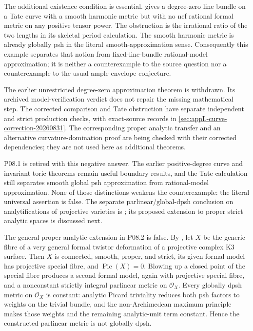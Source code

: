 The additional existence condition is essential.
 gives a degree-zero
line bundle on a Tate curve with a smooth harmonic metric but with no nef
rational formal metric on any positive tensor power.  The obstruction is
the irrational ratio of the two lengths in its skeletal period
calculation.  The smooth harmonic metric is already globally psh in the
literal smooth-approximation sense.  Consequently this example separates
that notion from fixed-line-bundle rational-model approximation; it is
neither a counterexample to the source question nor a counterexample to
the usual ample envelope conjecture.

The earlier unrestricted degree-zero approximation theorem is withdrawn.
Its archived model-verification verdict does not repair the missing
mathematical step.  The corrected comparison and Tate obstruction have
separate independent and strict production checks, with exact-source
records in \cref{sec:appL-curve-correction-20260831}.  The corresponding
proper analytic transfer and an alternative curvature-domination proof
are being checked with their corrected dependencies; they are not used
here as additional theorems.

P08.1 is retired with this negative answer.  The earlier positive-degree
curve and invariant toric theorems remain useful boundary results, and the
Tate calculation still separates smooth global psh approximation from
rational-model approximation.  None of those distinctions weakens the
counterexample: the literal universal assertion is false.  The separate
parlinear/global-dpsh conclusion on analytifications of projective varieties
is \cite[Corollary~17.8.9]{CLD25}; its proposed extension to proper strict
analytic spaces is discussed next.

The general proper-analytic extension in P08.2 is false.  By
, let \(X\) be the
generic fibre of a very general formal twistor deformation of a projective
complex K3 surface.  Then \(X\) is connected, smooth, proper, and strict, its
given formal model has projective special fibre, and
\(\operatorname{Pic}(X)=0\).  Blowing up a closed point of the special fibre
produces a second formal model, again with projective special fibre, and a
nonconstant strictly integral parlinear metric on \(\mathcal O_X\).  Every
globally dpsh metric on \(\mathcal O_X\) is constant: analytic Picard
triviality reduces both psh factors to weights on the trivial bundle, and
the non-Archimedean maximum principle makes those weights and the remaining
analytic-unit term constant.  Hence the constructed parlinear metric is not
globally dpsh.

